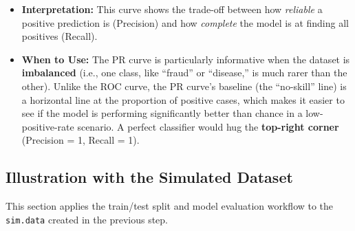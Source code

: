 \documentclass[
  letterpaper,
]{scrbook}
\providecommand{\tightlist}{%
  \setlength{\itemsep}{0pt}\setlength{\parskip}{0pt}}\usepackage{longtable,booktabs,array}
\begin{document}
\begin{itemize}
  \begin{itemize}
  \tightlist
  \item
    \textbf{Interpretation:} This curve shows the trade-off between how
    \emph{reliable} a positive prediction is (Precision) and how
    \emph{complete} the model is at finding all positives (Recall).
  \item
    \textbf{When to Use:} The PR curve is particularly informative when
    the dataset is \textbf{imbalanced} (i.e., one class, like ``fraud''
    or ``disease,'' is much rarer than the other). Unlike the ROC curve,
    the PR curve's baseline (the ``no-skill'' line) is a horizontal line
    at the proportion of positive cases, which makes it easier to see if
    the model is performing significantly better than chance in a
    low-positive-rate scenario. A perfect classifier would hug the
    \textbf{top-right corner} (Precision = 1, Recall = 1).
  \end{itemize}
\end{itemize}

\subsection{Illustration with the Simulated
Dataset}\label{illustration-with-the-simulated-dataset}

This section applies the train/test split and model evaluation workflow
to the \texttt{sim.data} created in the previous step.
\end{document}
